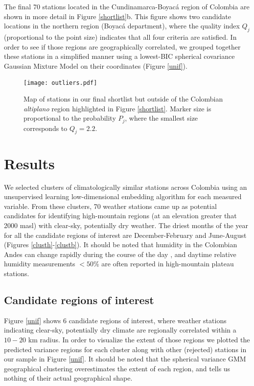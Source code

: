 \documentclass[12pt]{iopart}
\begin{document}
The final 70 stations located in the Cundinamarca-Boyac\'a region of Colombia are shown in more detail in Figure \ref{shortlist}b. This figure shows two candidate locations in the northern region (Boyac\'a department), where the quality index $Q_j$ (proportional to the point size) indicates that all four criteria are satisfied. In order to see if those regions are geographically correlated, we grouped together these stations in a simplified manner using a lowest-BIC spherical covariance Gaussian Mixture Model on their coordinates (Figure \ref{unif}).

\begin{figure}
\begin{center}
\texttt{[image: outliers.pdf]}
\caption{Map of stations in our final shortlist but outside of the Colombian \emph{altiplano} region highlighted in Figure \ref{shortlist}. Marker size is proportional to the probability $P_j$, where the smallest size corresponds to $Q_j=2.2$.}\label{outliers}
\end{center}
\end{figure}



\section{Results}

We selected clusters of climatologically similar stations across Colombia using an unsupervised learning low-dimensional embedding algorithm for each measured variable. From these clusters, 70 weather stations came up as potential candidates for identifying high-mountain regions (at an elevation greater that 2000 masl) with clear-sky, potentially dry weather. The driest months of the year for all the candidate regions of interest are December-February and June-August (Figures \ref{clusth}-\ref{clustb}). It should be noted that  humidity in the Colombian Andes can change rapidly during the course of the day \cite{pinzon}, and daytime relative humidity measurements $<50$\% are often reported in high-mountain plateau stations.

\subsection{Candidate regions of interest}

Figure \ref{unif} shows 6 candidate regions of interest, where weather stations indicating clear-sky, potentially dry climate are regionally correlated within a $10-20$ km radius. In order to visualize the extent of those regions we plotted the predicted variance regions for each cluster along with other (rejected) stations in our sample in Figure \ref{unif}. It should be noted that the spherical variance GMM geographical clustering overestimates the extent of each region, and tells us nothing of their actual geographical shape. \\
\end{document}

